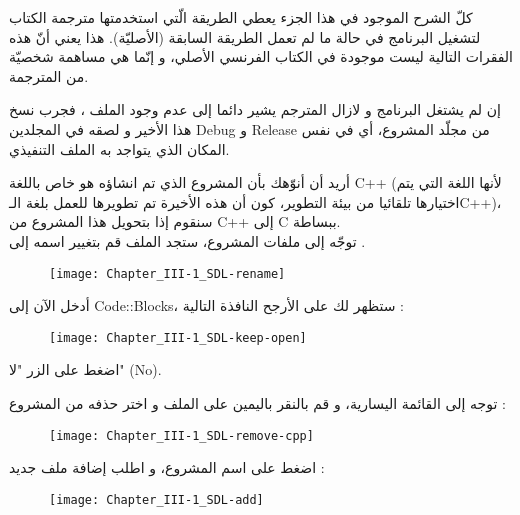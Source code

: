 \begin{tcolorbox}[breakable,title=ملاحظات مترجمة الكتاب, colback=orange!20, colframe=orange!70, fontupper=\footnotesize, coltitle=white, fonttitle=\normalsize, attach title]
كلّ الشرح الموجود في هذا الجزء يعطي الطريقة الّتي استخدمتها مترجمة الكتاب لتشغيل البرنامج في حالة ما لم تعمل الطريقة السابقة (الأصليّة). هذا يعني أنّ هذه الفقرات التالية ليست موجودة في الكتاب الفرنسي الأصلي، و إنّما هي مساهمة شخصيّة من المترجمة.
\tcblower

إن لم يشتغل البرنامج و لازال المترجم يشير دائما إلى عدم وجود الملف 
،
فجرب نسخ هذا الأخير و لصقه في المجلدين 
\textenglish{Debug}
و 
\textenglish{Release}
من مجلّد المشروع، أي في نفس المكان الذي يتواجد به الملف التنفيذي.

أريد أن أنوّهك بأن المشروع الذي تم انشاؤه هو خاص باللغة 
\textenglish{C++}
(لأنها اللغة التي يتم اختيارها تلقائيا من بيئة التطوير، كون أن هذه الأخيرة تم تطويرها للعمل بلغة الـ\textenglish{C++})،
سنقوم إذا بتحويل هذا المشروع من
\textenglish{C++}
إلى 
\textenglish{C}
ببساطة.\\
توجّه إلى ملفات المشروع، ستجد الملف
قم بتغيير اسمه إلى
.

 \begin{figure}[H]
	\centering
	\texttt{[image: Chapter\_III-1\_SDL-rename]}
\end{figure}

أدخل الآن إلى
\textenglish{Code::Blocks}،
ستظهر لك على الأرجح النافذة التالية :

 \begin{figure}[H]
	\centering
	\texttt{[image: Chapter\_III-1\_SDL-keep-open]}
\end{figure}


اضغط على الزر "لا"
(\textenglish{No}).

توجه إلى القائمة اليسارية، و قم بالنقر باليمين على الملف
و اختر حذفه من المشروع :

\begin{figure}[H]
	\centering
	\texttt{[image: Chapter\_III-1\_SDL-remove-cpp]}
\end{figure}

اضغط على اسم المشروع، و اطلب إضافة ملف جديد :

\begin{figure}[H]
	\centering
	\texttt{[image: Chapter\_III-1\_SDL-add]}
\end{figure}


\end{tcolorbox}
